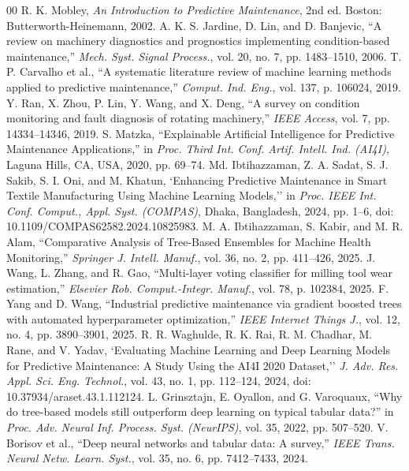 \documentclass[conference]{IEEEtran}
\begin{document}
\begin{itemize}
\begin{thebibliography}{00}
 R. K. Mobley, \textit{An Introduction to Predictive Maintenance}, 2nd ed. Boston: Butterworth-Heinemann, 2002.
 A. K. S. Jardine, D. Lin, and D. Banjevic, ``A review on machinery diagnostics and prognostics implementing condition-based maintenance,'' \textit{Mech. Syst. Signal Process.}, vol. 20, no. 7, pp. 1483--1510, 2006.
 T. P. Carvalho et al., ``A systematic literature review of machine learning methods applied to predictive maintenance,'' \textit{Comput. Ind. Eng.}, vol. 137, p. 106024, 2019.
 Y. Ran, X. Zhou, P. Lin, Y. Wang, and X. Deng, ``A survey on condition monitoring and fault diagnosis of rotating machinery,'' \textit{IEEE Access}, vol. 7, pp. 14334--14346, 2019.
 S. Matzka, ``Explainable Artificial Intelligence for Predictive Maintenance Applications,'' in \textit{Proc. Third Int. Conf. Artif. Intell. Ind. (AI4I)}, Laguna Hills, CA, USA, 2020, pp. 69--74.
 Md. Ibtihazzaman, Z. A. Sadat, S. J. Sakib, S. I. Oni, and M. Khatun, `Enhancing Predictive Maintenance in Smart Textile Manufacturing Using Machine Learning Models,'' in \textit{Proc. IEEE Int. Conf. Comput., Appl. Syst. (COMPAS)}, Dhaka, Bangladesh, 2024, pp. 1--6, doi: 10.1109/COMPAS62582.2024.10825983.\n{} M. A. Ibtihazzaman, S. Kabir, and M. R. Alam, ``Comparative Analysis of Tree-Based Ensembles for Machine Health Monitoring,'' \textit{Springer J. Intell. Manuf.}, vol. 36, no. 2, pp. 411--426, 2025.
 J. Wang, L. Zhang, and R. Gao, ``Multi-layer voting classifier for milling tool wear estimation,'' \textit{Elsevier Rob. Comput.-Integr. Manuf.}, vol. 78, p. 102384, 2025.
 F. Yang and D. Wang, ``Industrial predictive maintenance via gradient boosted trees with automated hyperparameter optimization,'' \textit{IEEE Internet Things J.}, vol. 12, no. 4, pp. 3890--3901, 2025.
 R. R. Waghulde, R. K. Rai, R. M. Chadhar, M. Rane, and V. Yadav, `Evaluating Machine Learning and Deep Learning Models for Predictive Maintenance: A Study Using the AI4I 2020 Dataset,'' \textit{J. Adv. Res. Appl. Sci. Eng. Technol.}, vol. 43, no. 1, pp. 112--124, 2024, doi: 10.37934/araset.43.1.112124.\n{} L. Grinsztajn, E. Oyallon, and G. Varoquaux, ``Why do tree-based models still outperform deep learning on typical tabular data?'' in \textit{Proc. Adv. Neural Inf. Process. Syst. (NeurIPS)}, vol. 35, 2022, pp. 507--520.
 V. Borisov et al., ``Deep neural networks and tabular data: A survey,'' \textit{IEEE Trans. Neural Netw. Learn. Syst.}, vol. 35, no. 6, pp. 7412--7433, 2024.

\end{thebibliography}
\end{itemize}
\end{document}
